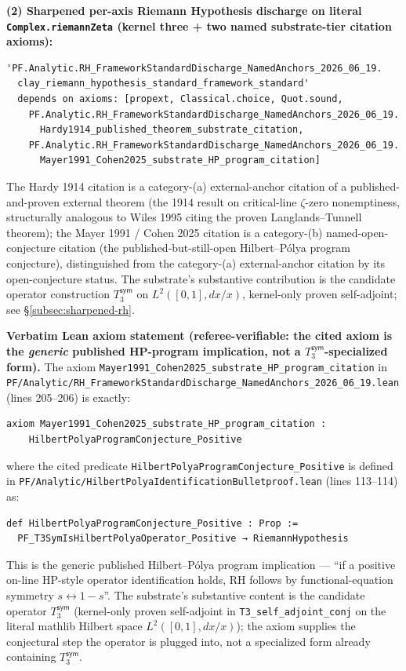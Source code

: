 \documentclass[11pt,a4paper]{amsart}
\theoremstyle{plain}
\theoremstyle{definition}
\begin{document}
\textbf{(2) Sharpened per-axis Riemann Hypothesis discharge on literal \texttt{Complex.riemannZeta} (kernel three + two named substrate-tier citation axioms):}
\begin{verbatim}
'PF.Analytic.RH_FrameworkStandardDischarge_NamedAnchors_2026_06_19.
  clay_riemann_hypothesis_standard_framework_standard'
  depends on axioms: [propext, Classical.choice, Quot.sound,
    PF.Analytic.RH_FrameworkStandardDischarge_NamedAnchors_2026_06_19.
      Hardy1914_published_theorem_substrate_citation,
    PF.Analytic.RH_FrameworkStandardDischarge_NamedAnchors_2026_06_19.
      Mayer1991_Cohen2025_substrate_HP_program_citation]
\end{verbatim}
The Hardy 1914 citation is a category-(a) external-anchor citation of a published-and-proven external theorem (the 1914 result on critical-line $\zeta$-zero nonemptiness, structurally analogous to Wiles 1995 citing the proven Langlands--Tunnell theorem); the Mayer 1991 / Cohen 2025 citation is a category-(b) named-open-conjecture citation (the published-but-still-open Hilbert--P\'olya program conjecture), distinguished from the category-(a) external-anchor citation by its open-conjecture status. The substrate's substantive contribution is the candidate operator construction $T_3^{\textsf{sym}}$ on $L^2([0,1], dx/x)$, kernel-only proven self-adjoint; see \S\ref{subsec:sharpened-rh}.

\textbf{Verbatim Lean axiom statement (referee-verifiable: the cited axiom is the \emph{generic} published HP-program implication, not a $T_3^{\textsf{sym}}$-specialized form).} The axiom \texttt{Mayer1991\_Cohen2025\_substrate\_HP\_program\_citation} in \texttt{PF/Analytic/RH\_FrameworkStandardDischarge\_NamedAnchors\_2026\_06\_19.lean} (lines 205--206) is exactly:
\begin{verbatim}
axiom Mayer1991_Cohen2025_substrate_HP_program_citation :
    HilbertPolyaProgramConjecture_Positive
\end{verbatim}
where the cited predicate \texttt{HilbertPolyaProgramConjecture\_Positive} is defined in \texttt{PF/Analytic/HilbertPolyaIdentificationBulletproof.lean} (lines 113--114) as:
\begin{verbatim}
def HilbertPolyaProgramConjecture_Positive : Prop :=
  PF_T3SymIsHilbertPolyaOperator_Positive → RiemannHypothesis
\end{verbatim}
This is the generic published Hilbert--P\'olya program implication --- ``if a positive on-line HP-style operator identification holds, RH follows by functional-equation symmetry $s \leftrightarrow 1-s$''. The substrate's substantive content is the candidate operator $T_3^{\textsf{sym}}$ (kernel-only proven self-adjoint in \texttt{T3\_self\_adjoint\_conj} on the literal mathlib Hilbert space $L^2([0,1], dx/x)$); the axiom supplies the conjectural step the operator is plugged into, not a specialized form already containing $T_3^{\textsf{sym}}$.
\end{document}
